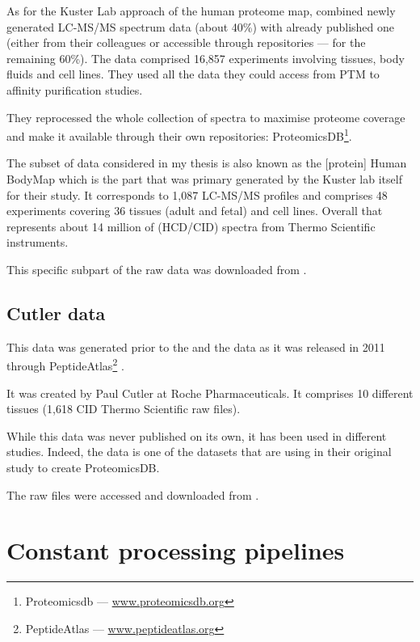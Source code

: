 As for the Kuster Lab approach of the human proteome map,
\cite{KusterData} combined newly generated \gls{LC-MS/MS} spectrum
data (about 40\%) with already published one
(either from their colleagues or accessible through repositories ---
for the remaining 60\%).
The data comprised 16,857 experiments involving tissues, body fluids and cell
lines. They used all the data they could access from \gls{PTM} to affinity
purification studies.

They reprocessed the whole collection of spectra to maximise proteome coverage
and make it available through their own repositories: ProteomicsDB\footnote{%
Proteomicsdb --- %
\href{https://www.proteomicsdb.org/}{www.proteomicsdb.org}}.

The subset of data considered in my thesis is also
known as the [protein] Human BodyMap which is the part that was primary generated
by the Kuster lab itself for their study. It corresponds to 1,087 \gls{LC-MS/MS}
profiles and comprises 48 experiments covering 36 tissues (adult and fetal) and
cell lines. Overall that represents about 14 million of (\gls{HCD}/\gls{CID})
spectra from Thermo Scientific instruments.

This specific subpart of the raw data was downloaded from .

\subsection{Cutler data}
\begin{comment}
    rexpliquer quelle partie reutilisée
\end{comment}

This data was generated prior to the  and the 
data as it was released in 2011 through PeptideAtlas\footnote{PeptideAtlas --- %
\href{http://www.peptideatlas.org/}{www.peptideatlas.org}}
\citep{PeptideAtlas}.

It was created by Paul Cutler at Roche Pharmaceuticals.
It comprises 10 different tissues (1,618 \gls{CID} Thermo Scientific raw files).

While this data was never published on its own, it has been used in different
studies. Indeed, the  data is one of the datasets that
\cite{KusterData} are using in their original study to create ProteomicsDB.

The raw files were accessed and downloaded from .


\section{Constant processing pipelines}

